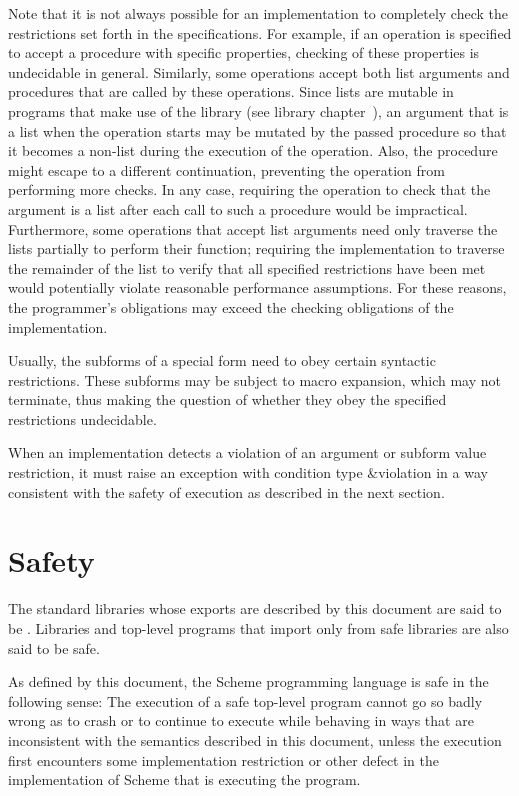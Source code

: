 Note that it is not always possible for an implementation to completely check
the restrictions set forth in the specifications.  For example, if an
operation is specified to accept a procedure with specific properties,
checking of these properties is undecidable in general.  Similarly,
some operations accept both list arguments and procedures that are
called by these operations.  Since lists are mutable in programs that
make use of the  library (see library
chapter~), an argument that is a list
when the operation starts may be mutated by the passed procedure so
that it becomes a non-list during the execution of the operation.
Also, the procedure might escape to a different continuation,
preventing the operation from performing more checks.
In any case, requiring the operation to check that the argument is a list after
each call to such a procedure would be impractical.  Furthermore, some
operations that accept list arguments need only traverse the lists
partially to perform their function; requiring the implementation to
traverse the remainder of the list to verify that all specified
restrictions have been met would potentially
violate reasonable performance assumptions.  For these reasons, the
programmer's obligations may exceed the checking obligations of the
implementation.

Usually, the subforms of a special form need to obey certain syntactic
restrictions.  These subforms may be subject to macro expansion, which
may not terminate, thus making the question of whether they obey the
specified restrictions undecidable.

When an implementation detects a violation of an argument or
subform value restriction, it must raise an exception with
condition type {\cf\&violation} in a way
consistent with the safety of execution as described in the next
section.

\section{Safety}
\label{safeunsafemodesection}

The standard libraries whose exports are described by this document
are said to be .  Libraries and top-level
programs that import only from safe libraries are also said to be safe.

As defined by this document, the Scheme programming language
is safe in the following sense:
The execution of a safe top-level program
cannot go so badly wrong as to crash or to continue to
execute while behaving in ways that are
inconsistent with the semantics described in this document,
unless the execution first encounters some implementation
restriction or other defect in the implementation of Scheme
that is executing the program.

